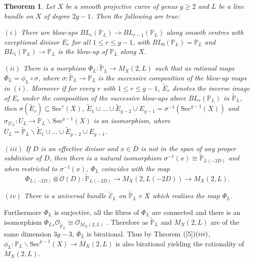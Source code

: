\documentclass[12pt, reqno]{amsart}
\newtheorem{theorem}{Theorem}[section]
\newcommand{\Sec}{\textrm{Sec}}
\begin{document}
\begin{theorem}\label{5}\cite[Theorem 1]{b}
Let $X$ be a smooth projective curve of genus $g\geq 2$ and $L$ be a line bundle on $X$ of degree $2g-1$. Then the following are true:


$(i)$ There are  blow-ups $BL_{r}(\mathbb{P}_{L})\rightarrow BL_{r-1}(\mathbb{P}_{L})$ along smooth centres  with exceptional divisor $E_{r}$ for all $1\leq r\leq g-1$, with $BL_{0}(\mathbb{P}_{L})=\mathbb{P}_{L}$ and $BL_{1}(\mathbb{P}_{L})\rightarrow \mathbb{P}_{L}$ is the blow-up of $\mathbb{P}_{L}$ along $X$.

$(ii)$ There is a morphism $\Phi_{L}:\widetilde{\mathbb{P}}_{L}\rightarrow M_{X}(2,L)$ such that as rational maps $\Phi_{L}=\phi_{L}\circ \sigma$, where $\sigma:\widetilde{\mathbb{P}}_{L}\rightarrow \mathbb{P}_{L}$ is the successive composition of the blow-up maps in $(i)$. Moreover if for every $r$ with $1\leq r\leq g-1$, $\widetilde{E}_{r}$ denotes the inverse image of $E_{r}$ under the composition of the successive blow-ups above $BL_{r}(\mathbb{P}_{L})$ in $\widetilde{\mathbb{P}}_{L}$, then $\sigma(\widetilde{E}_{r})\subseteq \Sec^{r}(X)$, $\widetilde{E}_{1}\cup...\cup\widetilde{E}_{g-2}\cup {E}_{g-1}=\sigma^{-1}(\Sec^{g-1}(X))$ and $\sigma_{|U_{L}}:U_{L}\rightarrow \mathbb{P}_{L}\backslash \Sec^{g-1}(X)$ is an isomorphism, where $U_{L}=\widetilde{\mathbb{P}}_{L}\backslash \widetilde{E}_{1}\cup...\cup\widetilde{E}_{g-2}\cup {E}_{g-1}$.

$(iii)$ If $D$ is an effective divisor and $x\in\overline{D}$ is not in the span of any proper subdivisor of $D$, then there is a natural isomorphism $\sigma^{-1}(x)\cong \widetilde{\mathbb{P}}_{L(-2D)}$ and when restricted to $\sigma^{-1}(x)$, $\Phi_{L}$ coincides with the map 
\[\Phi_{L(-2D)}\otimes \mathcal{O}(D): \widetilde{\mathbb{P}}_{L(-2D)}\rightarrow M_{X}(2,L(-2D))\rightarrow M_{X}(2,L).\]

$(iv)$ There is a universal bundle $\widetilde{\mathscr{E}}_{L}$ on $\widetilde{\mathbb{P}}_{L}\times X$ which realises the map $\Phi_{L}$. 
\end{theorem}
Furthermore $\Phi_{L}$ is surjective, all the fibres of $\Phi_{L}$ are connected and there is an isomorphism ${\Phi_{L}}_{*}\mathcal{O}_{\widetilde{\mathbb{P}}_{L}}\cong \mathcal{O}_{M_{X}(2,L)}$ \cite[ Proposition $(4.5)$]{b}. Therefore as $\widetilde{\mathbb{P}}_{L}$ and $M_{X}(2,L)$ are of the same dimension $3g-3$, $\Phi_{L}$ is birational. Thus by Theorem $(\ref{5})(iii)$, $\phi_{L}:\mathbb{P}_{L}\backslash \Sec^{g-1}(X)\rightarrow M_{X}(2,L)$ is also birational yielding the rationality of $M_{X}(2,L)$. 
\end{document}
